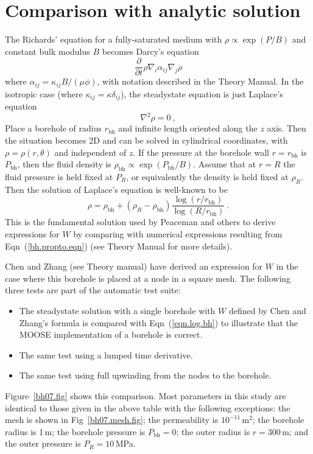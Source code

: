 \documentclass[]{scrreprt}
\begin{document}
\section{Comparison with analytic solution}
The Richards' equation for a fully-saturated medium with $\rho \propto
\exp(P/B)$ and constant bulk modulus $B$ becomes Darcy's equation
\begin{equation}
\frac{\partial}{\partial t}\rho \nabla_{i}\alpha_{ij}\nabla_{j}\rho
\end{equation}
where $\alpha_{ij} = \kappa_{ij}B/(\mu\phi)$, with notation described
in the Theory Manual.   In the isotropic case (where $\kappa_{ij} =
\kappa \delta_{ij}$), the steadystate equation is just Laplace's
equation
\begin{equation}
\nabla^{2}\rho = 0 \ ,
\end{equation}
Place a borehole of radius $r_{\mathrm{bh}}$ and infinite length
oriented along the $z$ axis.  Then the situation becomes 2D and can be
solved in cylindrical coordinates, with $\rho=\rho(r,\theta)$ and
independent of $z$.  If the pressure at the borehole wall
$r=r_{\mathrm{bh}}$ is $P_{\mathrm{bh}}$, then the fluid density is
$\rho_{\mathrm{bh}} \propto \exp(P_{\mathrm{bh}}/B)$.  Assume that at
$r=R$ the fluid pressure is held fixed at $P_{R}$, or equivalently the
density is held fixed at $\rho_{R}$.  Then the solution of Laplace's
equation is well-known to be
\begin{equation}
\rho = \rho_{\mathrm{bh}} + (\rho_{R} - \rho_{\mathrm{bh}})
\frac{\log(r/r_{\mathrm{bh}})}{\log(R/r_{\mathrm{bh}})} \ .
\label{eqn.log.bh}
\end{equation}
This is the fundamental solution used by Peaceman and others to derive
expressions for $W$ by comparing with numerical expressions resulting
from Eqn~(\ref{bh.propto.eqn}) (see Theory Manual for more details).

Chen and Zhang (see Theory manual) have derived an expression for $W$
in the case where this borehole is placed at a node in a square mesh.
The following three tests are part of the automatic test suite:
\begin{itemize}
\item The steadystate solution with a single borehole with $W$ defined by
Chen and Zhang's formula is compared with Eqn~(\ref{eqn.log.bh}) to
illustrate that the MOOSE implementation of a borehole is correct.
\item The same test using a lumped time derivative.
\item The same test using full upwinding from the nodes to the borehole.
\end{itemize}
Figure~\ref{bh07.fig} shows this comparison.  Most parameters in this
study are identical to those given in the above table with the
following exceptions: the mesh is shown in Fig~\ref{bh07.mesh.fig};
the permeability is $10^{-11}$\,m$^{2}$; the borehole radius is 1\,m;
the borehole pressure is $P_{\mathrm{bh}}=0$; the outer radius is
$r=300$\,m; and the outer pressure is $P_{R}=10$\,MPa.
\end{document}
